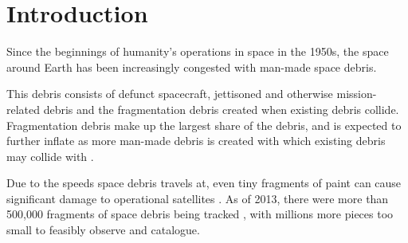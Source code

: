 \documentclass[12pt,openany,a4paper]{book}
\begin{document}
	\tableofcontents
	
	\listoffigures
	
	\listoftables
	
	
	\clearpage
	
	\mainmatter
	
	
	
	\chapter{Introduction}
	
		
		
		Since the beginnings of humanity's operations in space in the 1950s, the space around Earth has been increasingly congested with man-made space debris. \newline
		
		This debris consists of defunct spacecraft, jettisoned and otherwise mission-related debris and the fragmentation debris created when existing debris collide. Fragmentation debris make up the largest share of the debris, and is expected to further inflate as more man-made debris is created with which existing debris may collide with \cite{Allianz}. \newline
		
		Due to the speeds space debris travels at, even tiny fragments of paint can cause significant damage to operational satellites \cite{Congress}. As of 2013, there were more than 500,000 fragments of space debris being tracked \cite{Congress}, with millions more pieces too small to feasibly observe and catalogue.\newline
		
\end{document}
